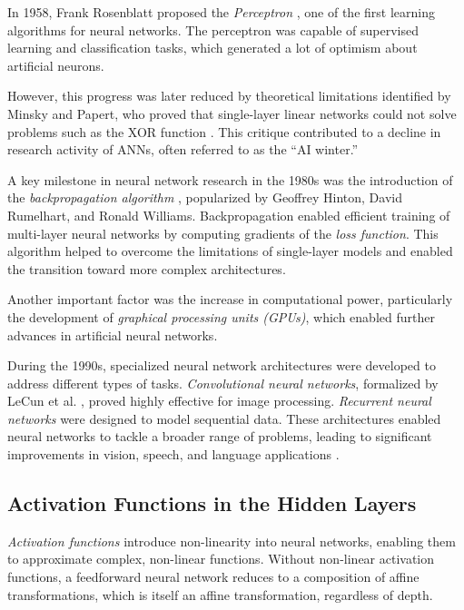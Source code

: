 In 1958, Frank Rosenblatt proposed the \textit{Perceptron} \cite{rosenblatt1958}, one of the first learning algorithms for neural networks. The perceptron was capable of supervised learning and classification tasks, which generated a lot of optimism about artificial neurons. 

However, this progress was later reduced by theoretical limitations identified by Minsky and Papert, who proved that single-layer linear networks could not solve problems such as the XOR function \cite{minsky1969}. This critique contributed to a decline in research activity of ANNs, often referred to as the “AI winter.” 

A key milestone in neural network research in the 1980s was the introduction of the \emph{backpropagation algorithm} \cite{rumelhart1986}, popularized by Geoffrey Hinton, David Rumelhart, and Ronald Williams. Backpropagation enabled efficient training of multi-layer neural networks by computing gradients of the \emph{loss function}. This algorithm helped to overcome the limitations of single-layer models \cite{lecun2015} and enabled the transition toward more complex architectures.

Another important factor was the increase in computational power, particularly the development of \emph{graphical processing units (GPUs)}, which enabled further advances in artificial neural networks.

During the 1990s, specialized neural network architectures were developed to address different types of tasks. \textit{Convolutional neural networks}, formalized by LeCun et al. \cite{lecun1998}, proved highly effective for image processing. \textit{Recurrent neural networks} were designed to model sequential data. These architectures enabled neural networks to tackle a broader range of problems, leading to significant improvements in vision, speech, and language applications \cite{lecun2015}.

\subsection{Activation Functions in the Hidden Layers}
\label{subsec:activation-functions-hidden-layer}
\emph{Activation functions} introduce non-linearity into neural networks, enabling them to approximate complex, non-linear functions. Without non-linear activation functions, a feedforward neural network reduces to a composition of affine transformations, which is itself an affine transformation, regardless of depth.

